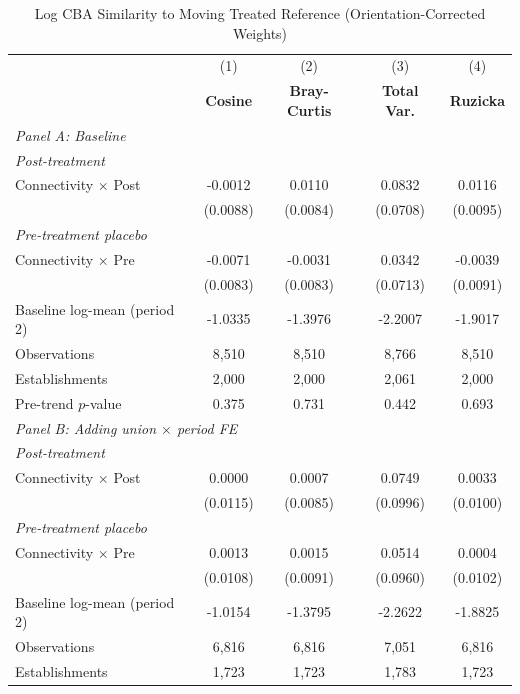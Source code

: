\begin{table}[H]
\centering
\caption{Log CBA Similarity to Moving Treated Reference (Orientation-Corrected Weights)}
\label{tab:corr_w_ln_cba_similarity}
\scriptsize
\setlength{\tabcolsep}{8pt}
\begin{tabular}{lcccc}
\hline\hline
 & (1) & (2) & (3) & (4) \\
 & \textbf{Cosine} & \textbf{Bray-Curtis} & \textbf{Total Var.} & \textbf{Ruzicka} \\
\hline
\multicolumn{5}{l}{\textit{Panel A: Baseline}} \\
\multicolumn{5}{l}{\textit{Post-treatment}} \\
Connectivity $\times$ Post & -0.0012 & 0.0110 & 0.0832 & 0.0116 \\
 & (0.0088) & (0.0084) & (0.0708) & (0.0095) \\
\multicolumn{5}{l}{\textit{Pre-treatment placebo}} \\
Connectivity $\times$ Pre & -0.0071 & -0.0031 & 0.0342 & -0.0039 \\
 & (0.0083) & (0.0083) & (0.0713) & (0.0091) \\
\hline
Baseline log-mean (period 2) & -1.0335 & -1.3976 & -2.2007 & -1.9017 \\
Observations &        8,510 &        8,510 &        8,766 &        8,510 \\
Establishments &        2,000 &        2,000 &        2,061 &        2,000 \\
Pre-trend $p$-value & 0.375 & 0.731 & 0.442 & 0.693 \\
\hline
\multicolumn{5}{l}{\textit{Panel B: Adding union $\times$ period FE}} \\
\multicolumn{5}{l}{\textit{Post-treatment}} \\
Connectivity $\times$ Post & 0.0000 & 0.0007 & 0.0749 & 0.0033 \\
 & (0.0115) & (0.0085) & (0.0996) & (0.0100) \\
\multicolumn{5}{l}{\textit{Pre-treatment placebo}} \\
Connectivity $\times$ Pre & 0.0013 & 0.0015 & 0.0514 & 0.0004 \\
 & (0.0108) & (0.0091) & (0.0960) & (0.0102) \\
\hline
Baseline log-mean (period 2) & -1.0154 & -1.3795 & -2.2622 & -1.8825 \\
Observations &        6,816 &        6,816 &        7,051 &        6,816 \\
Establishments &        1,723 &        1,723 &        1,783 &        1,723 \\

\end{tabular}
\end{table}
